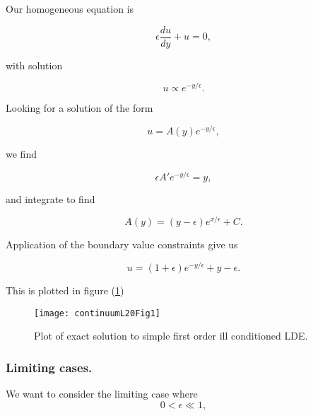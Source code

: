 Our homogeneous equation is

\begin{equation}\label{eqn:continuumL20:370}
\epsilon \frac{du}{dy} + u = 0,
\end{equation}

with solution

\begin{equation}\label{eqn:continuumL20:390}
u \propto e^{-y/\epsilon}.
\end{equation}

Looking for a solution of the form

\begin{equation}\label{eqn:continuumL20:410}
u = A(y) e^{-y/\epsilon},
\end{equation}

we find

\begin{equation}\label{eqn:continuumL20:430}
\epsilon A' e^{-y/\epsilon} = y,
\end{equation}

and integrate to find

\begin{equation}\label{eqn:continuumL20:450}
A(y) = (y - \epsilon) e^{x/\epsilon} + C.
\end{equation}

Application of the boundary value constraints give us

\begin{equation}\label{eqn:continuumL20:50}
u = ( 1 + \epsilon ) e^{-y/\epsilon} + y - \epsilon.
\end{equation}

This is plotted in figure (\ref{fig:continuumL20:continuumL20Fig1})
\begin{figure}[htp]
   \centering
   \texttt{[image: continuumL20Fig1]}
   \caption{Plot of exact solution to simple first order ill conditioned LDE.}\label{fig:continuumL20:continuumL20Fig1}
\end{figure}

\subsubsection{Limiting cases.}

We want to consider the limiting case where
\begin{equation}\label{eqn:continuumL20:70}
0 < \epsilon \ll 1,
\end{equation}

